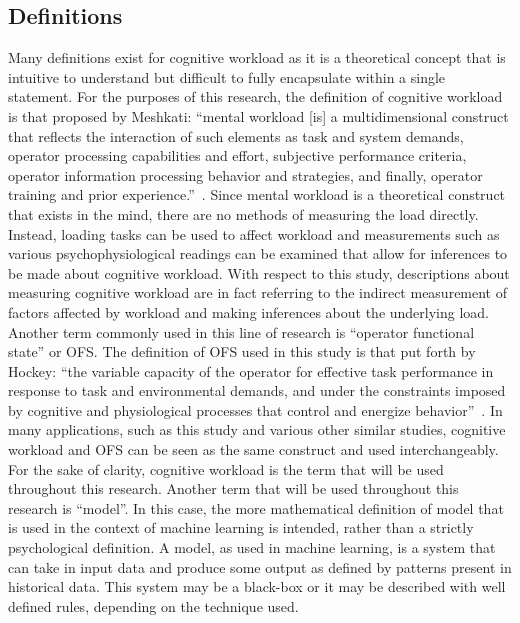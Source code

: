 \documentclass[11pt]{article}
\begin{document}
\subsection{Definitions}
Many definitions exist for cognitive workload as it is a theoretical concept that is intuitive to understand but difficult to fully encapsulate within a single statement. For the purposes of this research, the definition of cognitive workload is that proposed by Meshkati: ``mental workload [is] a multidimensional construct that reflects the interaction of such elements as task and system demands, operator processing capabilities and effort, subjective performance criteria, operator information processing behavior and strategies, and finally, operator training and prior experience.''~\cite{Meshkati}. Since mental workload is a theoretical construct that exists in the mind, there are no methods of measuring the load directly. Instead, loading tasks can be used to affect workload and measurements such as various psychophysiological readings can be examined that allow for inferences to be made about cognitive workload. With respect to this study, descriptions about measuring cognitive workload are in fact referring to the indirect measurement of factors affected by workload and making inferences about the underlying load. Another term commonly used in this line of research is ``operator functional state'' or OFS. The definition of OFS used in this study is that put forth by Hockey: ``the variable capacity of the operator for effective task performance in response to task and environmental demands, and under the constraints imposed by cognitive and physiological processes that control and energize behavior''~\cite{Hockey}. In many applications, such as this study and various other similar studies, cognitive workload and OFS can be seen as the same construct and used interchangeably. For the sake of clarity, cognitive workload is the term that will be used throughout this research. Another term that will be used throughout this research is ``model''. In this case, the more mathematical definition of model that is used in the context of machine learning is intended, rather than a strictly psychological definition. A model, as used in machine learning, is a system that can take in input data and produce some output as defined by patterns present in historical data. This system may be a black-box or it may be described with well defined rules, depending on the technique used.
\end{document}
